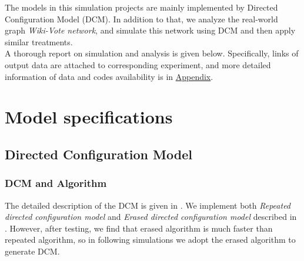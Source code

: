 \documentclass{article}
\begin{document}
The models in this simulation projects are mainly implemented by Directed Configuration Model (DCM). In addition to that, we analyze the real-world graph \emph{Wiki-Vote network}, and simulate this network using DCM and then apply similar treatments.\\

A thorough report on simulation and analysis is given below. Specifically, links of output data are attached to corresponding experiment, and more detailed information of data and codes availability is in \hyperlink{data_ava}{Appendix}.\\

\section{Model specifications}
	\subsection{Directed Configuration Model}
		
		\subsubsection{DCM and Algorithm} 
\par The detailed description of the DCM is given in \cite{algo}. We implement both \emph{Repeated directed configuration model} and \emph{Erased directed configuration model} described in \cite{algo}. However, after testing, we find that erased algorithm is much faster than repeated algorithm, so in following simulations we adopt the erased algorithm to generate DCM.
\end{document}
